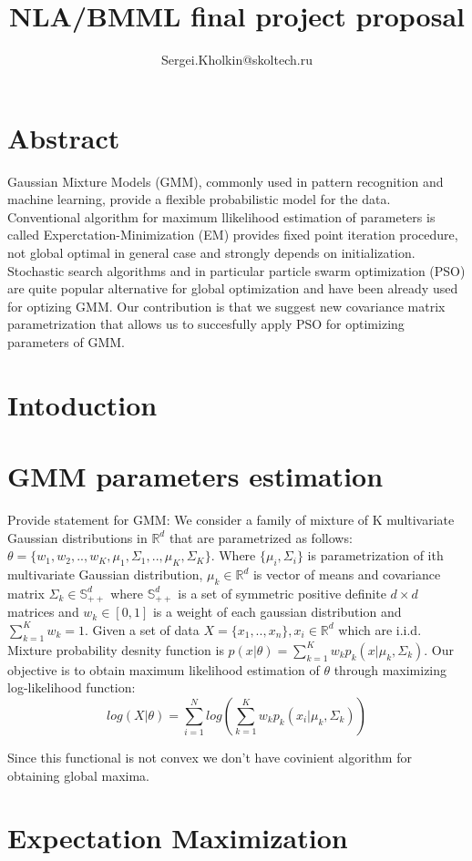 \documentclass[a4paper]{article}
\title{NLA/BMML final project proposal}
\author{Sergei.Kholkin@skoltech.ru}
\begin{document}
\section{Abstract}

Gaussian Mixture Models (GMM), commonly used in pattern recognition and machine learning, provide
a flexible probabilistic model for the data. Conventional algorithm for maximum llikelihood estimation of parameters 
is called Experctation-Minimization (EM) provides fixed point iteration procedure, 
not global optimal in general case and strongly depends on initialization. Stochastic search algorithms
 and in particular particle swarm optimization (PSO) are quite
popular alternative for global optimization and have been already used for optizing GMM. 
Our contribution is that we suggest new covariance matrix parametrization that allows us to succesfully apply PSO for optimizing parameters of GMM.

\section{Intoduction}

\section{GMM parameters estimation}

Provide statement for GMM:
We consider a family of mixture of K multivariate Gaussian distributions in $\mathbb{R}^d$ that are
 parametrized as follows: $\theta = \{w_1, w_2, .., w_K, \mu_1, \Sigma_1, .., \mu_K, \Sigma_K\}$. 
 Where $\{\mu_i, \Sigma_i\}$ is parametrization of ith multivariate Gaussian distribution, 
 $\mu_k \in \mathbb{R}^d$ is vector of means and covariance matrix $\Sigma_k \in \mathbb{S}^d_{++}$ where 
 $\mathbb{S}^d_{++}$ is a set of symmetric positive definite $d \times d$ matrices and $w_k \in [0, 1]$ 
 is a weight of each gaussian distribution and $\sum_{k=1}^K w_k=1$.
 Given a set of data $X = \{x_1, .., x_n\}, x_i \in \mathbb{R}^d$ which are i.i.d. Mixture probability desnity function is 
 $p(x | \theta) = \sum_{k=1}^K w_k p_k(x | \mu_k, \Sigma_k)$. Our objective is to obtain maximum likelihood estimation of $\theta$
 through maximizing log-likelihood function:
 $$log(X | \theta) = \sum_{i=1}^N log (\sum_{k=1}^K w_k p_k(x_i | \mu_k, \Sigma_k))$$

 Since this functional is not convex we don't have covinient algorithm for obtaining global maxima.

\section{Expectation Maximization}
\end{document}
